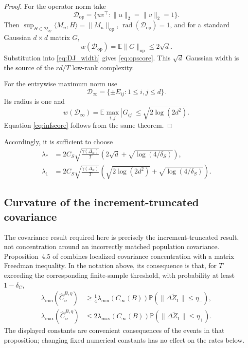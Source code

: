 \documentclass[12pt]{article}
\theoremstyle{definition}
\DeclareMathOperator{\rad}{rad}
\begin{document}
	\begin{proof}
		For the operator norm take
		\[\mathcal D_{\mathrm{op}}=\{uv^\top:\|u\|_2=\|v\|_2=1\}.\]
		Then $\sup_{H\in\mathcal D_{\mathrm{op}}}\langle M_n,H\rangle=\|M_n\|_{\mathrm{op}}$, $\rad(\mathcal D_{\mathrm{op}})=1$, and for a standard Gaussian $d\times d$ matrix $G$,
		\[w(\mathcal D_{\mathrm{op}})=\mathbb E\|G\|_{\mathrm{op}}\le2\sqrt d.\]
		Substitution into \eqref{eq:DJ_width} gives \eqref{eq:opscore}. This $\sqrt d$ Gaussian width is the source of the $rd/T$ low-rank complexity.
		
		For the entrywise maximum norm use
		\[\mathcal D_\infty=\{\pm E_{ij}:1\le i,j\le d\}.\]
		Its radius is one and
		\[w(\mathcal D_\infty)=\mathbb E\max_{i,j}|G_{ij}| \le\sqrt{2\log(2d^2)}.\]
		Equation \eqref{eq:infscore} follows from the same theorem.
	\end{proof}
	
	Accordingly, it is sufficient to choose
	\begin{align}
		\lambda_* &=2C_S\sqrt{\frac{\gamma(\Delta_n)}T}
		\left(2\sqrt d+\sqrt{\log(4/\delta_S)}\right), \label{eq:lambdastar}\\
		\lambda_1
		&=2C_S\sqrt{\frac{\gamma(\Delta_n)}T} \left(\sqrt{2\log(2d^2)}+\sqrt{\log(4/\delta_S)}\right). \label{eq:lambdaone}
	\end{align}
	
	\subsection{Curvature of the increment-truncated covariance}
	
	The covariance result required here is precisely the increment-truncated result, not concentration around an incorrectly matched population covariance. Proposition~4.5 of \citet{DexheimerJeszka2026} combines localized covariance concentration with a matrix Freedman inequality. In the notation above, its consequence is that, for $T$ exceeding the corresponding finite-sample threshold, with probability at least $1-\delta_C$,
	\begin{align}
		\lambda_{\min}(\widehat C_n^{B,\eta})
		&\ge\frac14\lambda_{\min}(C_\infty(B))
		\mathbb P(\|\Delta\widetilde Z_1\|\le\eta_-),
		\label{eq:cov_lower}\\
		\lambda_{\max}(\widehat C_n^{B,\eta})
		&\le2\lambda_{\max}(C_\infty(B))
		\mathbb P(\|\Delta\widetilde Z_1\|\le\eta_+).
		\label{eq:cov_upper}
	\end{align}
	The displayed constants are convenient consequences of the events in that proposition; changing fixed numerical constants has no effect on the rates below.
	
\end{document}
